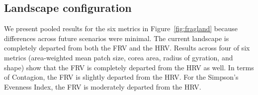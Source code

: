 \documentclass[12pt]{article}
\begin{document}
\begin{spacing}{1}



\subsection*{Landscape configuration}
We present pooled results for the six metrics in Figure~\ref{fig:fragland} because differences across future scenarios were minimal. The current landscape is completely departed from both the FRV and the HRV. Results across four of six metrics (area-weighted mean patch size, corea area, radius of gyration, and shape) show that the FRV is completely departed from the HRV as well. In terms of Contagion, the FRV is slightly departed from the HRV. For the Simpson's Evenness Index, the FRV is moderately departed from the HRV.


\end{spacing}
\end{document}
